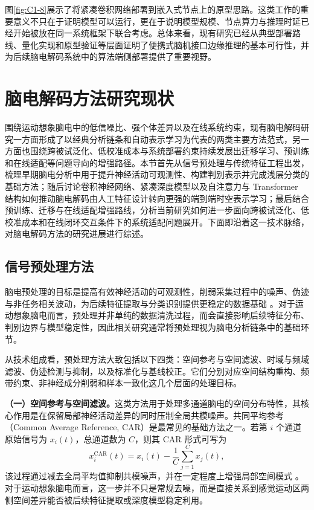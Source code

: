 图\ref{fig:C1-8}展示了将紧凑卷积网络部署到嵌入式节点上的原型思路。这类工作的重要意义不只在于证明模型可以运行，更在于说明模型规模、节点算力与推理时延已经开始被放在同一系统框架下联合考虑。总体来看，现有研究已经从典型部署路线、量化实现和原型验证等层面证明了便携式脑机接口边缘推理的基本可行性，并为后续脑电解码系统中的算法端侧部署提供了重要视野。

\section{脑电解码方法研究现状}

围绕运动想象脑电中的低信噪比、强个体差异以及在线系统约束，现有脑电解码研究一方面形成了以经典分析链条和自动表示学习为代表的两类主要方法范式，另一方面也围绕跨被试泛化、低校准成本与系统部署约束持续发展出迁移学习、预训练和在线适配等问题导向的增强路径。本节首先从信号预处理与传统特征工程出发，梳理早期脑电分析中用于提升神经活动可观测性、构建判别表示并完成浅层分类的基础方法；随后讨论卷积神经网络、紧凑深度模型以及自注意力与 Transformer 结构如何推动脑电解码由人工特征设计转向更强的端到端时空表示学习；最后结合预训练、迁移与在线适配增强路线，分析当前研究如何进一步面向跨被试泛化、低校准成本和在线闭环交互条件下的系统适配问题展开。下面即沿着这一技术脉络，对脑电解码方法的研究进展进行综述。

\subsection{信号预处理方法}

脑电预处理的目标是提高有效神经活动的可观测性，削弱采集过程中的噪声、伪迹与非任务相关波动，为后续特征提取与分类识别提供更稳定的数据基础 \cite{lotte2018review}。对于运动想象脑电而言，预处理并非单纯的数据清洗过程，而会直接影响后续特征分布、判别边界与模型稳定性，因此相关研究通常将预处理视为脑电分析链条中的基础环节。

从技术组成看，预处理方法大致包括以下四类：空间参考与空间滤波、时域与频域滤波、伪迹检测与抑制，以及标准化与基线校正。它们分别对应空间结构重构、频带约束、非神经成分削弱和样本一致化这几个层面的处理目标。

\textbf{（一）空间参考与空间滤波。}这类方法用于处理多通道脑电的空间分布特性，其核心作用是在保留局部神经活动差异的同时压制全局共模噪声。共同平均参考（Common Average Reference, CAR）是最常见的基础方法之一。若第 $i$ 个通道原始信号为 $x_i(t)$，总通道数为 $C$，则其 CAR 形式可写为
\begin{equation}
x_i^{\mathrm{CAR}}(t)=x_i(t)-\frac{1}{C}\sum_{j=1}^{C}x_j(t),
\end{equation}
该过程通过减去全局平均值抑制共模噪声，并在一定程度上增强局部空间模式 \cite{offner1950eeg}。对于运动想象脑电而言，这一步并不只是常规去噪，而是直接关系到感觉运动区两侧空间差异能否被后续特征提取或深度模型稳定利用。

